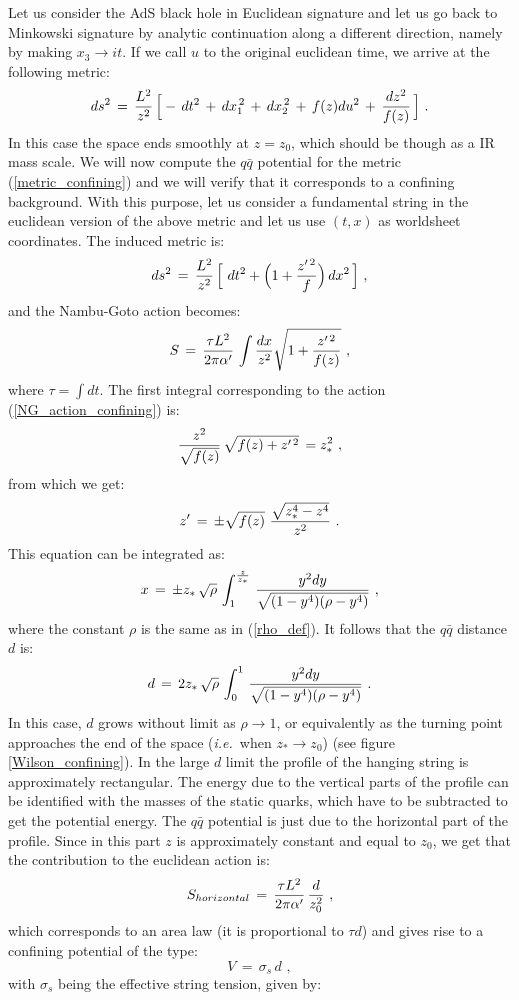\documentclass[12pt,notitlepage]{article}
\newcommand{\beq}{\begin{equation}}
\newcommand{\eeq}{\end{equation}}
\def\ie{{\emph{i.e.}}}
\begin{document}
Let us consider the AdS black hole in Euclidean signature and let us go back to Minkowski signature by analytic continuation along a different direction, namely by making $x_3\to it$. If we call $u$ to the original euclidean time, we arrive at the following metric:
\beq
ds^2\,=\,{L^2\over z^2}\,\Big[-\,dt^2\,+\,d x_1^{\,2}\,+\,d x_2^{\,2}\,+\,f(z) d u^2\,+\,
{dz^2\over f(z)}\,\Big]\,\,.
\label{metric_confining}
\eeq
In this case the space ends smoothly at $z=z_0$, which should be though as a IR mass scale. We will  now compute the $q\bar q$ potential for the metric (\ref{metric_confining})  and we will verify that it corresponds to a confining background. With this purpose,  let us consider a fundamental string in  the euclidean version of the above metric and let us use $(t,x)$ as worldsheet coordinates. The induced metric is:
\beq
ds^2\,=\,
{L^2\over z^2}\,\Big[\,\,dt^2+\Big(1+{z'^{\,2}\over f}\Big)\,dx^2\,\Big]\,\,,
\eeq
and the Nambu-Goto action becomes:
\beq
S\,=\,{\tau L^2\over 2\pi\alpha'}\,\int {dx \over z^2}
\sqrt{1+{z'^{\,2}\over f(z)}}\,\,,
\label{NG_action_confining}
\eeq
where $\tau=\int dt$. The first integral corresponding to the action (\ref{NG_action_confining})  is:
\beq
{z^2\over\sqrt{ f(z)}}\,\sqrt{f(z)+z'^{\,2}}\,=z_*^2\,\,,
\eeq
from which we get:
\beq
z'\,=\,\pm \sqrt{f(z)}\,\,
{\sqrt{z_*^4-z^4}\over z^2}\,\,.
\eeq
This equation can be integrated as:
\beq
x\,=\,\pm z_*\,\sqrt{\rho}\,
\int_{1}^{{z\over z_*}}\,
{y^2 dy\over \sqrt{(1-y^4)(\rho-y^4)}}\,\,,
\eeq
where the constant $\rho$ is the same as in (\ref{rho_def}). It follows that the $q\bar q$ distance $d$ is:
\beq
d\,=\,2 z_*\,\sqrt{\rho}\,
\int_{0}^{1}\,
{y^2 dy\over \sqrt{(1-y^4)(\rho-y^4)}}\,\,.
\eeq
In this case, $d$ grows without limit as $\rho\to 1$, or equivalently as the turning point approaches the end of the space (\ie\ when $z_*\to z_0$) (see figure \ref{Wilson_confining}). In the large $d$ limit the profile of the hanging string is approximately rectangular. The  energy due to the vertical parts of the profile can be identified with the masses of the static quarks, which have to be subtracted to get the potential energy.  The $q\bar q$ potential is just due to the horizontal part of the profile. Since in this part $z$ is approximately constant and equal to 
$z_0$, we get that the contribution to the euclidean action is:
\beq
S_{horizontal}\,=\,{\tau L^2\over 2\pi\alpha'}\,{d\over z_0^2}\,\,,
\eeq
which corresponds to an area law (it is proportional to $\tau d$) and gives rise to a confining potential of the type:
\beq
V\,=\,\sigma_s\,d\,\,,
\eeq
with $\sigma_s$ being the effective string tension, given by:
\end{document}
